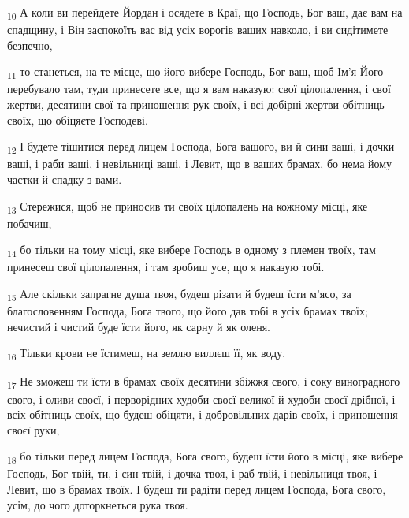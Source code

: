 \begin{tcolorbox}
\textsubscript{10} А коли ви перейдете Йордан і осядете в Краї, що Господь, Бог ваш, дає вам на спадщину, і Він заспокоїть вас від усіх ворогів ваших навколо, і ви сидітимете безпечно,
\end{tcolorbox}
\begin{tcolorbox}
\textsubscript{11} то станеться, на те місце, що його вибере Господь, Бог ваш, щоб Ім'я Його перебувало там, туди принесете все, що я вам наказую: свої цілопалення, і свої жертви, десятини свої та приношення рук своїх, і всі добірні жертви обітниць своїх, що обіцяєте Господеві.
\end{tcolorbox}
\begin{tcolorbox}
\textsubscript{12} І будете тішитися перед лицем Господа, Бога вашого, ви й сини ваші, і дочки ваші, і раби ваші, і невільниці ваші, і Левит, що в ваших брамах, бо нема йому частки й спадку з вами.
\end{tcolorbox}
\begin{tcolorbox}
\textsubscript{13} Стережися, щоб не приносив ти своїх цілопалень на кожному місці, яке побачиш,
\end{tcolorbox}
\begin{tcolorbox}
\textsubscript{14} бо тільки на тому місці, яке вибере Господь в одному з племен твоїх, там принесеш свої цілопалення, і там зробиш усе, що я наказую тобі.
\end{tcolorbox}
\begin{tcolorbox}
\textsubscript{15} Але скільки запрагне душа твоя, будеш різати й будеш їсти м'ясо, за благословенням Господа, Бога твого, що його дав тобі в усіх брамах твоїх; нечистий і чистий буде їсти його, як сарну й як оленя.
\end{tcolorbox}
\begin{tcolorbox}
\textsubscript{16} Тільки крови не їстимеш, на землю виллєш її, як воду.
\end{tcolorbox}
\begin{tcolorbox}
\textsubscript{17} Не зможеш ти їсти в брамах своїх десятини збіжжя свого, і соку виноградного свого, і оливи своєї, і перворідних худоби своєї великої й худоби своєї дрібної, і всіх обітниць своїх, що будеш обіцяти, і добровільних дарів своїх, і приношення своєї руки,
\end{tcolorbox}
\begin{tcolorbox}
\textsubscript{18} бо тільки перед лицем Господа, Бога свого, будеш їсти його в місці, яке вибере Господь, Бог твій, ти, і син твій, і дочка твоя, і раб твій, і невільниця твоя, і Левит, що в брамах твоїх. І будеш ти радіти перед лицем Господа, Бога свого, усім, до чого доторкнеться рука твоя.
\end{tcolorbox}
